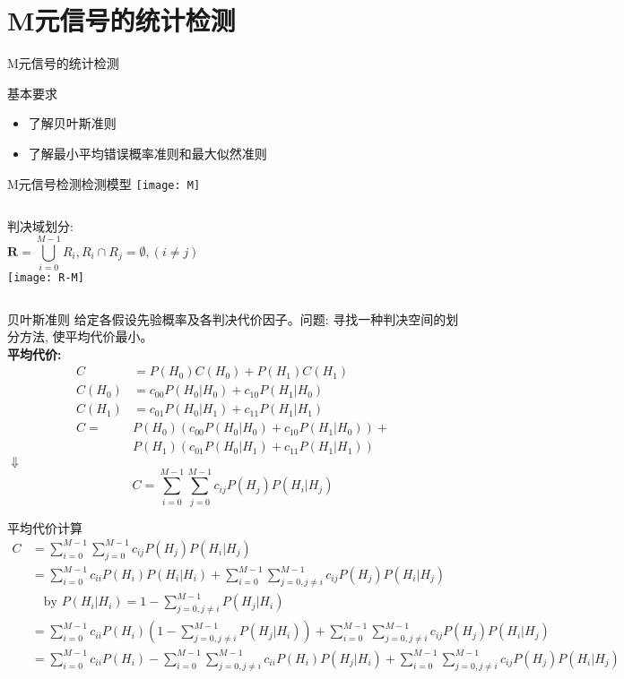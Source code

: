 \section{M元信号的统计检测}

\begin{frame}{M元信号的统计检测}
\begin{block}{基本要求}
	\begin{itemize} 
		\item 了解贝叶斯准则
		\item 了解最小平均错误概率准则和最大似然准则
	\end{itemize}
\end{block}
\end{frame}

\begin{frame}{M元信号检测检测模型}
\texttt{[image: M]}
\newline
\begin{columns}
	判决域划分:
	\[\bm{R}=\bigcup_{i=0}^{M-1}R_i, R_i\cap R_j=\emptyset, (i\ne j) \]
	\texttt{[image: R-M]}
\end{columns}
\end{frame}

\begin{frame}[shrink]{贝叶斯准则}
给定各假设先验概率及各判决代价因子。问题: 寻找一种判决空间的划分方法, 使平均代价最小。\\
\textbf{平均代价: }
\begin{align*}
C&=P(H_0)C(H_0)+P(H_1)C(H_1)\\
C(H_0)&=c_{00}P(H_0|H_0)+c_{10}P(H_1|H_0)\\
C(H_1)&=c_{01}P(H_0|H_1)+c_{11}P(H_1|H_1)\\
C=&P(H_0)(c_{00}P(H_0|H_0)+c_{10}P(H_1|H_0))+\\
&P(H_1)(c_{01}P(H_0|H_1)+c_{11}P(H_1|H_1))
\end{align*}
\centering$\Downarrow$
\[
C=\sum_{i=0}^{M-1}\sum_{j=0}^{M-1}c_{ij}P(H_j)P(H_i|H_j)
\]
\end{frame}

\begin{frame}[shrink]{平均代价计算}
\begin{align*}
C&=\sum_{i=0}^{M-1}\sum_{j=0}^{M-1}c_{ij}P(H_j)P(H_i|H_j)\\
&=\sum_{i=0}^{M-1}c_{ii}P(H_i)P(H_i|H_i)+\sum_{i=0}^{M-1}\sum_{j=0,j\ne i}^{M-1}c_{ij}P(H_j)P(H_i|H_j)\\
&\quad \text{by } P(H_i|H_i)=1-\sum_{j=0,j\ne i}^{M-1}P(H_j|H_i)\\
&=\sum_{i=0}^{M-1}c_{ii}P(H_i)\left(1-\sum_{j=0,j\ne i}^{M-1}P(H_j|H_i)\right)+\sum_{i=0}^{M-1}\sum_{j=0,j\ne i}^{M-1}c_{ij}P(H_j)P(H_i|H_j)\\
&=\sum_{i=0}^{M-1}c_{ii}P(H_i)-\sum_{i=0}^{M-1}\sum_{j=0,j\ne i}^{M-1}c_{ii}P(H_i)P(H_j|H_i)+\sum_{i=0}^{M-1}\sum_{j=0,j\ne i}^{M-1}c_{ij}P(H_j)P(H_i|H_j)\\
\end{align*}
\end{frame}

